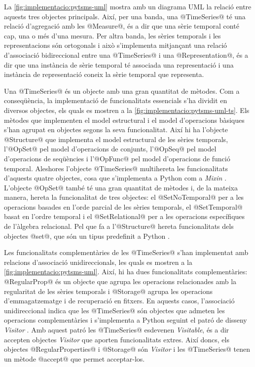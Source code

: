 La \autoref{fig:implementacio:pytsms-uml} mostra amb un diagrama
\gls{UML} la relació entre aquests tres objectes principals. Així, per una
banda, una @TimeSeries@ té una relació d'agregació amb les
@Measure@, és a dir que una sèrie temporal conté cap, una o més
d'una mesura.  Per altra banda, les sèries temporals i les
representacions són ortogonals i això s'implementa mitjançant una
relació d'associació bidireccional entre una @TimeSeries@ i una
@Representation@, és a dir que una instància de sèrie temporal té
associada una representació i una instància de representació coneix la
sèrie temporal que representa.




Una @TimeSeries@ és un objecte amb una gran quantitat de
mètodes. Com a conseqüència, la implementació de funcionalitats
essencials s'ha dividit en diversos objectes, els quals es mostren a
la \autoref{fig:implementacio:pytsms-uml-ts}. Els mètodes que
implementen el model estructural i el model d'operacions bàsiques
s'han agrupat en objectes segons la seva funcionalitat. Així hi ha
l'objecte @Structure@ que implementa el model estructural de les
sèries temporals, l'@OpSet@ pel model d'operacions de conjunts,
l'@OpSeq@ pel model d'operacions de seqüències i l'@OpFunc@
pel model d'operacions de funció temporal.  Aleshores l'objecte
@TimeSeries@ multihereta les funcionalitats d'aquests quatre
objectes, cosa que s'implementa a Python com a
\emph{Mixin} \parencite[\S 8.3.6, \S 20.17]{python:doc2}.  L'objecte
@OpSet@ també té una gran quantitat de mètodes i, de la mateixa
manera, hereta la funcionalitat de tres objectes: el
@SetNoTemporal@ per a les operacions basades en l'orde parcial de
les sèries temporals, el @SetTemporal@ basat en l'ordre temporal
i el @SetRelational@ per a les operacions específiques de
l'àlgebra relacional. Pel que fa a l'@Structure@ hereta
funcionalitats dels objectes @set@, que són un tipus predefinit a
Python \parencite[\S 5.7]{python:doc2}.


Les funcionalitats complementàries de les @TimeSeries@ s'han
implementat amb relacions d'associació unidireccionals, les quals es
mostren a la \autoref{fig:implementacio:pytsms-uml}. Així, hi ha dues
funcionalitats complementàries: @RegularProp@ és un objecte que agrupa
les operacions relacionades amb la regularitat de les sèries temporals
i @Storage@ agrupa les operacions d'emmagatzematge i de recuperació en
fitxers. En aquests casos, l'associació unidireccional indica que les
@TimeSeries@ són objectes que admeten les operacions complementàries i
s'implementa a Python seguint el patró de disseny
\emph{Visitor} \parencite{ziade08:expert_python_programming:visitor,martin02:visitor}. Amb
aquest patró les @TimeSeries@ esdevenen \emph{Visitable}, és a dir
accepten objectes \emph{Visitor} que aporten funcionalitats
extres. Així doncs, els objectes @RegularProperties@ i @Storage@ són
\emph{Visitor} i les @TimeSeries@ tenen un mètode @accept@ que permet
acceptar-los.


